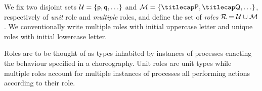 %

We fix two disjoint sets $\participants = \{\ptp p, \ptp q, \ldots\}$
and $\multiroles = \{\amulti P, \amulti Q, \ldots \}$, respectively of
\emph{unit} role and \emph{multiple} roles, and define the set of
\emph{roles} $\mathcal{R} = \mathcal{U} \cup \mathcal{M}$.
%
We conventionally write multiple roles with initial uppercase letter and
unique roles with initial lowercase letter.
%

Roles are to be thought of as types inhabited by instances of
processes enacting the behaviour specified in a choreography.
%
Unit roles are unit types while multiple roles account for multiple
instances of processes all performing actions according to their role.
%

